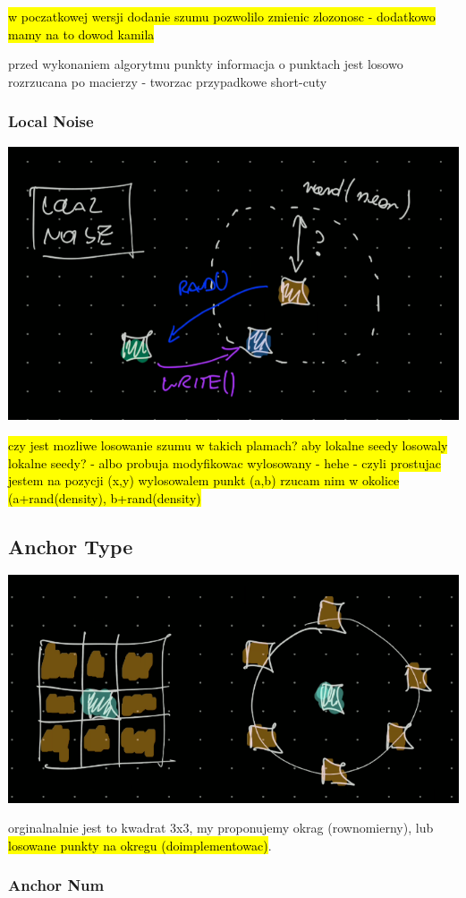 \documentclass{article}
\begin{document}
\hl{w poczatkowej wersji dodanie szumu pozwolilo zmienic zlozonosc - dodatkowo
mamy na to dowod kamila}

przed wykonaniem algorytmu punkty informacja o punktach jest losowo rozrzucana
po macierzy - tworzac przypadkowe short-cuty

\subsubsection{Local Noise} %

\includegraphics[width=0.5\linewidth]{../figures/idea_local_noise}

\hl{czy jest mozliwe losowanie szumu w takich plamach? aby lokalne seedy
losowaly lokalne seedy? - albo probuja modyfikowac wylosowany - hehe - czyli
prostujac jestem na pozycji (x,y) wylosowalem punkt (a,b) rzucam nim w okolice
(a+rand(density), b+rand(density)}

\subsection{Anchor Type} %

\includegraphics[width=0.5\linewidth]{../figures/idea_anchor_type}

orginalnalnie jest to kwadrat 3x3, my proponujemy okrag (rownomierny), lub
\hl{losowane punkty na okregu (doimplementowac)}.

\subsubsection{Anchor Num} %
\end{document}
